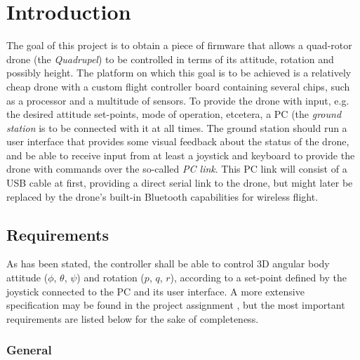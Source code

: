 \documentclass[final]{article}
\begin{document}
\section{Introduction}
The goal of this project is to obtain a piece of firmware that allows a quad-rotor drone (the \emph{Quadrupel}) to be controlled in terms of its attitude, rotation and possibly height.
The platform on which this goal is to be achieved is a relatively cheap drone with a custom flight controller board containing several chips, such as a processor and a multitude of sensors.
To provide the drone with input, e.g. the desired attitude set-points, mode of operation, etcetera, a PC (the \emph{ground station} is to be connected with it at all times.
The ground station should run a user interface that provides some visual feedback about the status of the drone, and be able to receive input from at least a joystick and keyboard to provide the drone with commands over the so-called \emph{PC link}.
This PC link will consist of a USB cable at first, providing a direct serial link to the drone, but might later be replaced by the drone's built-in Bluetooth capabilities for wireless flight.

\subsection{Requirements}
As has been stated, the controller shall be able to control 3D angular body attitude ($\phi$, $\theta$, $\psi$) and rotation ($p$, $q$, $r$), according to a set-point defined by the joystick connected to the PC and its user interface.
A more extensive specification may be found in the project assignment \cite[3-6]{langendoen2017in4073}, but the most important requirements are listed below for the sake of completeness.

\subsubsection{General}
\end{document}
